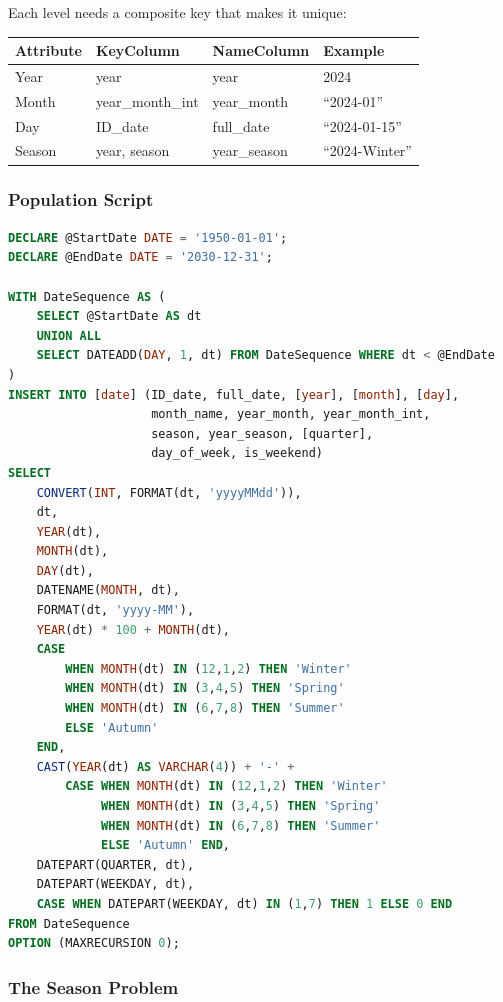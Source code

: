 Each level needs a composite key that makes it unique:

\begin{center}
\small
\begin{tabular}{@{}llll@{}}
\toprule
\textbf{Attribute} & \textbf{KeyColumn} & \textbf{NameColumn} & \textbf{Example} \\
\midrule
Year & year & year & 2024 \\
Month & year\_month\_int & year\_month & ``2024-01'' \\
Day & ID\_date & full\_date & ``2024-01-15'' \\
Season & year, season & year\_season & ``2024-Winter'' \\
\bottomrule
\end{tabular}
\end{center}

\subsubsection{Population Script}
\label{subsec:date-population}

\begin{lstlisting}[language=SQL]
DECLARE @StartDate DATE = '1950-01-01';
DECLARE @EndDate DATE = '2030-12-31';

WITH DateSequence AS (
    SELECT @StartDate AS dt
    UNION ALL
    SELECT DATEADD(DAY, 1, dt) FROM DateSequence WHERE dt < @EndDate
)
INSERT INTO [date] (ID_date, full_date, [year], [month], [day],
                    month_name, year_month, year_month_int,
                    season, year_season, [quarter],
                    day_of_week, is_weekend)
SELECT
    CONVERT(INT, FORMAT(dt, 'yyyyMMdd')),
    dt,
    YEAR(dt),
    MONTH(dt),
    DAY(dt),
    DATENAME(MONTH, dt),
    FORMAT(dt, 'yyyy-MM'),
    YEAR(dt) * 100 + MONTH(dt),
    CASE
        WHEN MONTH(dt) IN (12,1,2) THEN 'Winter'
        WHEN MONTH(dt) IN (3,4,5) THEN 'Spring'
        WHEN MONTH(dt) IN (6,7,8) THEN 'Summer'
        ELSE 'Autumn'
    END,
    CAST(YEAR(dt) AS VARCHAR(4)) + '-' +
        CASE WHEN MONTH(dt) IN (12,1,2) THEN 'Winter'
             WHEN MONTH(dt) IN (3,4,5) THEN 'Spring'
             WHEN MONTH(dt) IN (6,7,8) THEN 'Summer'
             ELSE 'Autumn' END,
    DATEPART(QUARTER, dt),
    DATEPART(WEEKDAY, dt),
    CASE WHEN DATEPART(WEEKDAY, dt) IN (1,7) THEN 1 ELSE 0 END
FROM DateSequence
OPTION (MAXRECURSION 0);
\end{lstlisting}

\subsubsection{The Season Problem}
\label{subsec:season-problem}

